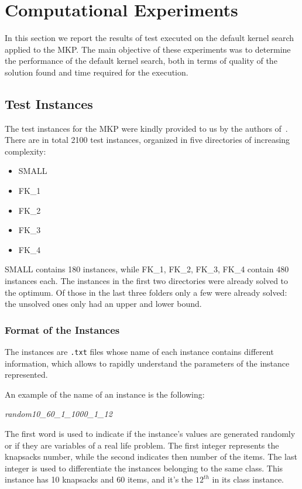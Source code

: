 \chapter{Computational Experiments}\label{ch:computational-experiments}
In this section we report the results of test executed on the default kernel search applied to the MKP\@.
The main objective of these experiments was to determine the performance of the default kernel search,
both in terms of quality of the solution found and time required for the execution.


\section{Test Instances}
The test instances for the MKP were kindly provided to us by the authors of~\cite{mkp:2019}.\\
There are in total 2100 test instances, organized in
five directories of increasing complexity:
\begin{itemize}
    \item SMALL
    \item FK\_1
    \item FK\_2
    \item FK\_3
    \item FK\_4
\end{itemize}
SMALL contains 180 instances, while FK\_1, FK\_2, FK\_3, FK\_4 contain 480 instances each.
The instances in the first two directories were already solved to the optimum.
Of those in the last three folders only a few were already solved: the unsolved
ones only had an upper and lower bound.

\subsection{Format of the Instances}
The instances are \texttt{.txt} files whose name of each instance contains different information,
which allows to rapidly understand the parameters of the instance represented.

An example of the name of an instance is the following:
\begin{center}
    \textit{random10\_60\_1\_1000\_1\_12}
\end{center}
The first word is used to indicate if the instance's values are generated randomly or if they are variables of a real
life problem.
The first integer represents the knapsacks number, while the second indicates then number of the items.
The last integer is used to differentiate the instances belonging to the same class.
This instance has 10 knapsacks and 60 items, and it's the \(12^{th}\) in its class instance.

